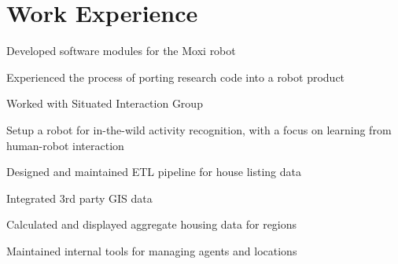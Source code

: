 \documentclass[]{deedy-resume}
\begin{document}
\hfill
\begin{minipage}[t]{0.66\textwidth}


\section{Work Experience}
\vspace{0.3cm}
\begin{tightemize}
\item Developed software modules for the Moxi robot
\item Experienced the process of porting research code into a robot product
\end{tightemize}
\sectionsep

\vspace{0.3cm}
\begin{tightemize}
\item Worked with Situated Interaction Group
\item Setup a robot for in-the-wild activity recognition, with a focus on learning from human-robot interaction
\end{tightemize}
\sectionsep

\begin{tightemize}
\item Designed and maintained ETL pipeline for house listing data
\item Integrated 3rd party GIS data
\item Calculated and displayed aggregate housing data for regions
\item Maintained internal tools for managing agents and locations
\end{tightemize}
\sectionsep



\end{minipage}
\end{document}
